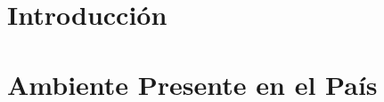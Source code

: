 \documentclass[12pt,journal,compsoc]{IEEEtran}
\begin{document}
\section{Introducci\'{o}n}



\section{Ambiente Presente en el Pa\'{i}s}
%
%
\end{document}
